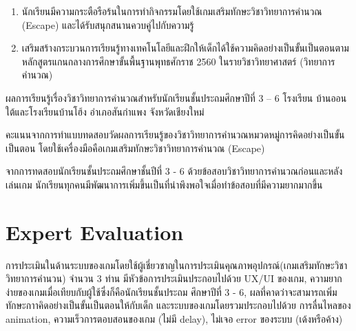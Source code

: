 \begin{enumerate}
    \item นักเรียนมีความกระตือรือร้นในการทำกิจกรรมโดยใช้เกมเสริมทักษะวิชาวิทยาการคำนวณ (Escape) และได้รับสนุกสนานควบคู่ไปกับความรู้ 
    \item เสริมสร้างกระบวนการเรียนรู้ทางเทคโนโลยีและฝึกให้เด็กได้ใช้ความคิดอย่างเป็นขั้นเป็นตอนตามหลักสูตรแกนกลางการศึกษาขั้นพื้นฐานพุทธศักราช 2560 ในรายวิชาวิทยาศาสตร์ (วิทยาการคำนวณ)
\end{enumerate}
ผลการเรียนรู้เรื่องวิชาวิทยาการคำนวณสำหรับนักเรียนชั้นประถมศึกษาปีที่ 3 – 6 โรงเรียน บ้านออนใต้และโรงเรียนบ้านโฮ้ง อำเภอสันกำแพง จังหวัดเชียงใหม่\par
คะแนนจากการทำแบบทดสอบวัดผลการเรียนรู้ของวิชาวิทยาการคำนวณหมวดหมู่การคิดอย่างเป็นขั้นเป็นตอน โดยใช้เครื่องมือคือเกมเสริมทักษะวิชาวิทยาการคำนวณ (Escape)\par
\bigskip

\bigskip

จากการทดสอบนักเรียนชั้นประถมศึกษาชั้นปีที่ 3 - 6 ด้วยข้อสอบวิชาวิทยาการคำนวณก่อนและหลังเล่นเกม นักเรียนทุกคนมีพัฒนาการเพิ่มขึ้นเป็นที่น่าพึงพอใจเมื่อทำข้อสอบที่มีความยากมากขึ้น


\section{Expert Evaluation}
การประเมินในด้านระบบของเกมโดยใช้ผู้เชี่ยวชาญในการประเมินคุณภาพอุปกรณ์(เกมเสริมทักษะวิชาวิทยาการคำนวน) จำนวน 3 ท่าน มีหัวข้อการประเมินประกอบไปด้วย UX/UI ของเกม, ความยากง่ายของเกมเมื่อเทียบกับผู้ใช้ซึ่งก็คือนักเรียนชั้นประถม
ศึกษาปีที่ 3 - 6, ผลที่คาดว่าจะสามารถเพิ่มทักษะกาาคิดอย่างเป็นขั้นเป็นตอนให้กับเด็ก และระบบของเกมโดยรวมประกอบไปด้วย 
การลื่นไหลของ animation, ความเร็วการตอบสอนของเกม (ไม่มี delay), ไม่เจอ error ของระบบ (เด้งหรือค้าง)
